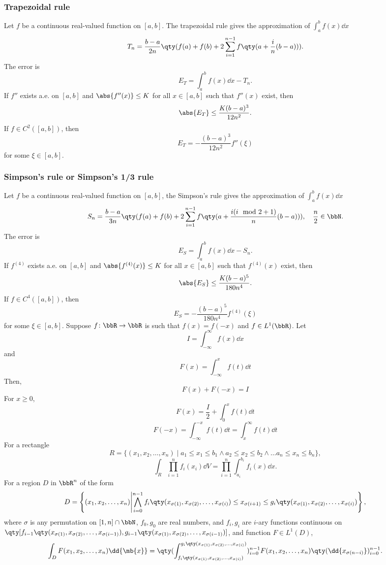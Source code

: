 \subsubsection{Trapezoidal rule}
Let $f$ be a continuous real-valued function on $[a,b]$. The trapezoidal rule gives the approximation of $\int_a^bf(x)\dd{x}$
\[T_n=\frac{b-a}{2n}\qty(f(a)+f(b)+2\sum_{i=1}^{n-1}f\qty(a+\frac{i}{n}(b-a))).\]
The error is
\[E_T=\int_a^bf(x)\dd{x}-T_n.\]
If $f''$ exists a.e. on $[a,b]$ and $\abs{f''(x)}\leq K$ for all $x\in[a,b]$ such that $f''(x)$ exist, then
\[\abs{E_T}\leq\frac{K(b-a)^3}{12n^2}.\]
If $f\in C^2([a,b])$, then
\[E_T=-\frac{(b-a)^3}{12n^2}f''(\xi)\]
for some $\xi\in[a,b]$.
\subsubsection{Simpson's rule or Simpson's 1/3 rule}
Let $f$ be a continuous real-valued function on $[a,b]$, the Simpson's rule gives the approximation of $\int_a^bf(x)\dd{x}$
\[S_n=\frac{b-a}{3n}\qty(f(a)+f(b)+2\sum_{i=1}^{n-1}f\qty(a+\frac{i(i\mod 2+1)}{n}(b-a))),\quad\frac{n}{2}\in\bbN.\]
The error is
\[E_S=\int_a^bf(x)\dd{x}-S_n.\]
If $f^{(4)}$ exists a.e. on $[a,b]$ and $\abs{f^{(4)}(x)}\leq K$ for all $x\in[a,b]$ such that $f^{(4)}(x)$ exist, then
\[\abs{E_S}\leq\frac{K(b-a)^5}{180n^4}.\]
If $f\in C^4([a,b])$, then
\[E_S=-\frac{(b-a)^5}{180n^4}f^{(4)}(\xi)\]
for some $\xi\in[a,b]$.
Suppose $f\colon\bbR\to\bbR$ is such that $f(x)=f(-x)$ and $f\in L^1(\bbR)$. Let
\[I=\int_{-\infty}^{\infty}f(x)\dd{x}\]
and
\[F(x)=\int_{-\infty}^xf(t)\dd{t}\]
Then,
\[F(x)+F(-x)=I\]
\bpr
For $x\ge 0$,
\[F(x)=\frac{I}{2}+\int_0^xf(t)\dd{t}\]
\[F(-x)=\int_{-\infty}^{-x}f(t)\dd{t}=\int_x^{\infty}f(t)\dd{t}\]
\epr
{}
For a rectangle
\[R=\{(x_1,x_2,\ldots,x_n)\mid a_1\le x_1\le b_1\land a_2\le x_2\le b_2\land\ldots a_n\le x_n\le b_n\},\]
\[\int_R\prod_{i=1}^nf_i(x_i)\dd{V}=\prod_{i=1}^n\int_{a_i}^{b_i}f_i(x)\dd{x}.\]
For a region $D$ in $\bbR^n$ of the form
\[D=\left\{(x_1,x_2,\ldots,x_n)\middle|\bigwedge_{i=0}^{n-1}f_i\qty(x_{\sigma(1)},x_{\sigma(2)},\ldots,x_{\sigma(i)})\le x_{\sigma(i+1)}\le g_i\qty(x_{\sigma(1)},x_{\sigma(2)},\ldots,x_{\sigma(i)})\right\},\]
where $\sigma$ is any permutation on $[1,n]\cap\bbN$, $f_0,g_0$ are real numbers, and $f_i,g_i$ are $i$-ary functions continuous on $\qty[f_{i-1}\qty(x_{\sigma(1)},x_{\sigma(2)},\ldots,x_{\sigma(i-1)}),g_{i-1}\qty(x_{\sigma(1)},x_{\sigma(2)},\ldots,x_{\sigma(i-1)})]$, and function $F\in L^1(D)$,
\[\int_DF(x_1,x_2,\ldots,x_n)\dd{\mb{x}}=\qty(\int_{f_i\qty(x_{\sigma(1)},x_{\sigma(2)},\ldots,x_{\sigma(i)})}^{g_i\qty(x_{\sigma(1)},x_{\sigma(2)},\ldots,x_{\sigma(i)})})_{i=0}^{n-1}F(x_1,x_2,\ldots,x_n)\qty(\dd{x_{\sigma(n-i)}})_{i=0}^{n-1}.\]
